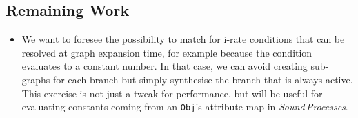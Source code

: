 \documentclass[11pt,a4paper]{article}
\newcommand{\software}[1]{\textit{#1}}
\begin{document}
\subsection{Remaining Work}

\begin{itemize}
\item We want to foresee the possibility to match for i-rate conditions that can be resolved at graph expansion time, for example because the condition evaluates to a constant number. In that case, we can avoid creating sub-graphs for each branch but simply synthesise the branch that is always active. This exercise is not just a tweak for performance, but will be useful for evaluating constants coming from an \Verb!Obj!'s attribute map in \software{Sound\,Processes}.
\end{itemize}

\end{document}

